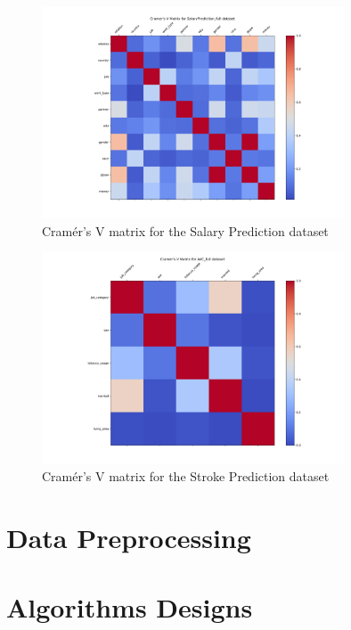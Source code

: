 \documentclass[runningheads]{paper}
\begin{document}
\begin{figure}[H]
    \centering
    \includegraphics[width=0.8\textwidth]{../plots/cramer_v_matrix_SalaryPrediction_full.png}
    \caption{Cramér's V matrix for the Salary Prediction dataset}
    \label{fig:cramer_v_matrix_example_salary}
\end{figure}

\begin{figure}[H]
    \centering
    \includegraphics[width=0.8\textwidth]{../plots/cramer_v_matrix_AVC_full.png}
    \caption{Cramér's V matrix for the Stroke Prediction dataset}
    \label{fig:cramer_v_matrix_example_stroke}
\end{figure}

\section{Data Preprocessing}

\section{Algorithms Designs}
\end{document}
